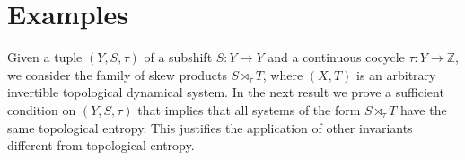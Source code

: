 \documentclass[a4paper,oneside]{amsart}
\renewcommand{\(}{\begin{dmath*}}
\renewcommand{\)}{\end{dmath*}}
\theoremstyle{definition}
\newcommand{\Z}{\mathbb{Z}}
\begin{document}
\section{Examples}
Given a tuple $(Y,S,\tau)$ of a subshift $S\colon Y\to Y$ and a continuous cocycle $\tau\colon Y\to \Z$, we consider the family of skew products $S\rtimes_\tau T$, where $(X,T)$ is an arbitrary invertible topological dynamical system. In the next result we prove a sufficient condition on $(Y,S,\tau)$ that implies that all systems of the form $S\rtimes_\tau T$ have the same topological  entropy. This justifies the application of other invariants different from topological entropy. 


\end{document}
